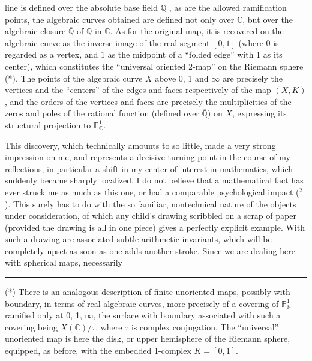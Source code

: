 
line is defined over the absolute base field $\mathbb{Q}$ ,
as are the allowed ramification points, the algebraic curves
obtained are defined not only over $\mathbb{C}$, but over the algebraic
closure $\overline{\mathbb{Q}}$ of $\mathbb{Q}$ in $\mathbb{C}$. As for the original map, it
is recovered on the algebraic curve as the inverse image of the real
segment $[0,1]$ (where $0$ is regarded as a vertex, and $1$ as
the midpoint of a ``folded edge'' with 1 as its center), which constitutes
the ``universal oriented 2-map'' on the Riemann sphere (*).
The points of the algebraic curve $X$ above 0, 1 and $\infty$
are precisely the vertices and the ``centers'' of the edges and
faces respectively of the map $(X,K)$, and the orders of the vertices
and faces are precisely the multiplicities of the zeros and
poles of the rational function (defined over $\overline{\mathbb{Q}}$) on $X$,
expressing its structural projection to $\mathbb{P}^1_{\mathbb{C}}$.

This discovery, which technically amounts to so little,
made a very strong impression on me, and represents
a decisive turning point in the course of my reflections, in particular
a shift in my center of interest in mathematics, which
suddenly became sharply localized. I do not believe that a
mathematical fact has ever struck me as much as this one, or had
a comparable psychological impact ($^2$). This surely has to do with the
so familiar, nontechnical nature of the objects under consideration,
of which any child's drawing scribbled on a scrap of paper (provided
the drawing is all in one piece) gives a perfectly
explicit example. With such a drawing are associated subtle arithmetic
invariants, which will be completely upset as soon as
one adds another stroke. Since we are dealing here with spherical maps, necessarily

\noindent\rule{4cm}{0.4pt}

(*) There is an analogous description of finite unoriented maps,
possibly with boundary, in terms of \uline{real} algebraic curves,
more precisely of a covering of $\mathbb{P}^1_{\mathbb{R}}$ ramified only at 0, 1, $\infty$,
the surface with boundary associated with such a covering being $X(\mathbb{C})/\tau$, where $\tau$
is complex conjugation. The ``universal'' unoriented map is
here the disk, or upper hemisphere of the Riemann sphere, equipped,
as before, with the embedded 1-complex $K = [0,1]$.


